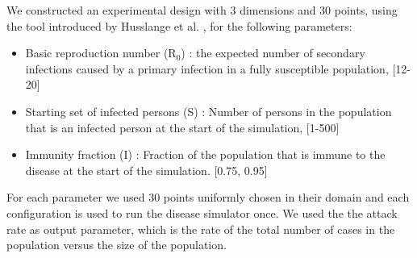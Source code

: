 We constructed an experimental design with 3 dimensions and 30 points, using the tool introduced by Husslange et al. \citep{DOE}, for the following parameters:
\begin{itemize}
\item Basic reproduction number (R$_0$) : the expected number of secondary infections caused by a primary infection in a fully susceptible population, [12-20]
\item Starting set of infected persons (S) : Number of persons in the population that is an infected person at the start of the simulation, [1-500]
\item Immunity fraction (I) : Fraction of the population that is immune to the disease at the start of the simulation. [0.75, 0.95]
\end{itemize}
For each parameter we used 30 points uniformly chosen in their domain and each configuration is used to run the disease simulator once. 
We used the the attack rate as output parameter, which is the rate of the total number of cases in the population versus the size of the population. 



